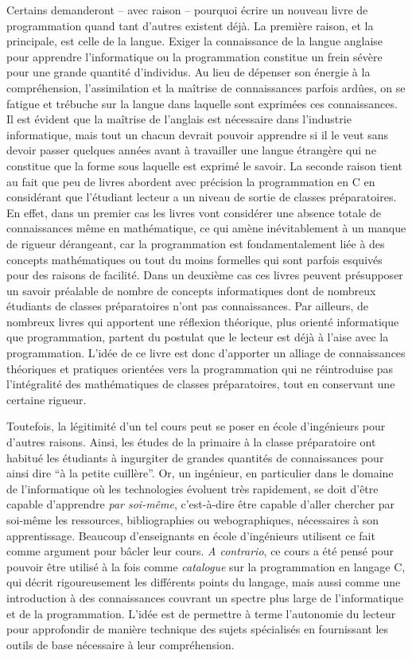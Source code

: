 \documentclass[../main.tex]{subfiles}
\begin{document}
Certains demanderont -- avec raison -- pourquoi écrire un nouveau livre de programmation quand tant d'autres existent déjà. La première raison, et la principale, est celle de la langue. Exiger la connaissance de la langue anglaise pour apprendre l'informatique ou la programmation constitue un frein sévère pour une grande quantité d'individus. Au lieu de dépenser son énergie à la compréhension, l'assimilation et la maîtrise de connaissances parfois ardûes, on se fatigue et trébuche sur la langue dans laquelle sont exprimées ces connaissances. Il est évident que la maîtrise de l'anglais est nécessaire dans l'industrie informatique, mais tout un chacun devrait pouvoir apprendre si il le veut sans devoir passer quelques années avant à travailler une langue étrangère qui ne constitue que la forme sous laquelle est exprimé le savoir. La seconde raison tient au fait que peu de livres abordent avec précision la programmation en C en considérant que l'étudiant lecteur a un niveau de sortie de classes préparatoires. En effet, dans un premier cas les livres vont considérer une absence totale de connaissances même en mathématique, ce qui amène inévitablement à un manque de rigueur dérangeant, car la programmation est fondamentalement liée à des concepts mathématiques ou tout du moins formelles qui sont parfois esquivés pour des raisons de facilité. Dans un deuxième cas ces livres peuvent présupposer un savoir préalable de nombre de concepts informatiques dont de nombreux étudiants de classes préparatoires n'ont pas connaissances. Par ailleurs, de nombreux livres qui apportent une réflexion théorique, plus orienté informatique que programmation, partent du postulat que le lecteur est déjà à l'aise avec la programmation. L'idée de ce livre est donc d'apporter un alliage de connaissances théoriques et pratiques orientées vers la programmation qui ne réintroduise pas l'intégralité des mathématiques de classes préparatoires, tout en conservant une certaine rigueur.

Toutefois, la légitimité d'un tel cours peut se poser en école d'ingénieurs pour d'autres raisons. Ainsi, les études de la primaire à la classe préparatoire ont habitué les étudiants à ingurgiter de grandes quantités de connaissances pour ainsi dire ``à la petite cuillère''. Or, un ingénieur, en particulier dans le domaine de l'informatique où les technologies évoluent très rapidement, se doit d'être capable d'apprendre \textit{par soi-même}, c'est-à-dire être capable d'aller chercher par soi-même les ressources, bibliographies ou webographiques, nécessaires à son apprentissage. Beaucoup d'enseignants en école d'ingénieurs utilisent ce fait comme argument pour bâcler leur cours. \textit{A contrario}, ce cours a été pensé pour pouvoir être utilisé à la fois comme \textit{catalogue} sur la programmation en langage C, qui décrit rigoureusement les différents points du langage, mais aussi comme une introduction à des connaissances couvrant un spectre plus large de l'informatique et de la programmation. L'idée est de permettre à terme l'autonomie du lecteur pour approfondir de manière technique des sujets spécialisés en fournissant les outils de base nécessaire à leur compréhension.
\end{document}
